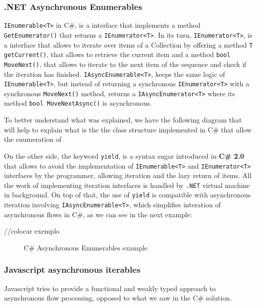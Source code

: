\subsubsection{.NET Asynchronous Enumerables}
\label{csenums}
	\texttt{IEnumerable<T>} in C\#, is a interface that implements a method \texttt{GetEnumerator()} that returns a \texttt{IEnumerator<T>}. 
	In its turn, \texttt{IEnumerator<T>}, is a interface that allows to iterate over items of a Collection by offering a method \texttt{T getCurrent()}, that allows to retrieve the current item 
	and a method \texttt{bool MoveNext()}, that allows to iterate to the next item of the sequence and check if the iteration has finished.
	\texttt{IAsyncEnumerable<T>}, keeps the same logic of \texttt{IEnumerable<T>}, but instead of returning a synchronous \texttt{IEnumerator<T>} with a synchronous \texttt{MoveNext()} method, returns a \texttt{IAsyncEnumerator<T>} where its method \texttt{bool MoveNextAsync()} is asynchronous. 
	
	To better understand what was explained, we have the following diagram that will help to explain what is the the class structure implemented in C\# that allow the enumeration of 


	On the other side, the keyword \texttt{yield}, is a syntax sugar introduced in \textbf{C\# 2.0} that allows to avoid the implementation of \texttt{IEnumerable<T>} and \texttt{IEnumerator<T>} interfaces by the programmer,
	allowing iteration and the lazy return of items. All the work of implementing iteration interfaces is handled by \texttt{.NET} virtual machine in background. 
	On top of that, the use of \texttt{yield} is compatible with asynchronous iteration involving \texttt{IAsyncEnumerable<T>}, which simplifies interation of asynchronous flows in C\#, as we can see in the next example:
	
	//colocar exemplo 

	\begin{figure}[H]
		\centering
		\caption{C\# Asynchronous Enumerables example}
		\label{fig:enumex}
	\end{figure}

\subsubsection{Javascript asynchronous iterables}
\label{jsae}
	Javascript tries to provide a functional and weakly typed approach to asynchronous flow processing, opposed to what we saw in the C\# solution.

